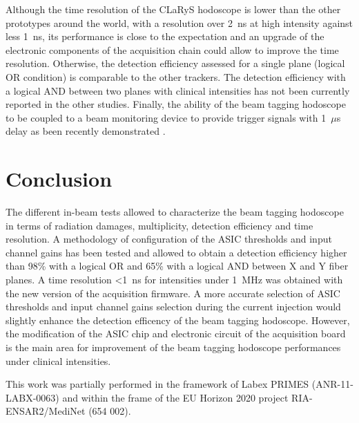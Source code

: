 \documentclass[a4paper,11pt]{article}
\begin{document}
Although the time resolution of the CLaRyS hodoscope is lower than the other prototypes around the world, with a resolution over 2~ns at high intensity against less 1~ns, its performance is close to the expectation and an upgrade of the electronic components of the acquisition chain could allow to improve the time resolution. Otherwise, the detection efficiency assessed for a single plane (logical OR condition) is comparable to the other trackers. The detection efficiency with a logical AND between two planes with clinical intensities has not been currently reported in the other studies. Finally, the ability of the beam tagging hodoscope to be coupled to a beam monitoring device to provide trigger signals with 1~$\mu$s delay as been recently demonstrated \cite{Chen2019}.


\section{Conclusion}

The different in-beam tests allowed to characterize the beam tagging hodoscope in terms of radiation damages, multiplicity, detection efficiency and time resolution. A methodology of configuration of the ASIC thresholds and input channel gains has been tested and allowed to obtain a detection efficiency higher than 98\% with a logical OR and 65\% with a logical AND between X and Y fiber planes. A time resolution <1~ns for intensities under 1~MHz was obtained with the new version of the acquisition firmware. A more accurate selection of ASIC thresholds and input channel gains selection during the current injection would slightly enhance the detection efficency of the beam tagging hodoscope. However, the modification of the ASIC chip and electronic circuit of the acquisition board is the main area for improvement of the beam tagging hodoscope performances under clinical intensities.






\acknowledgments
This work was partially performed in the framework of Labex PRIMES (ANR-11-LABX-0063) and within the frame of the EU Horizon 2020 project RIA-ENSAR2/MediNet (654 002).  

\end{document}
